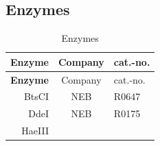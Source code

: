 \documentclass[11pt,singlespacinge,twoside]{reedthesis} %
\theoremstyle{definition}
\theoremstyle{definition}
\theoremstyle{definition}
\theoremstyle{remark}
\begin{document}
\hypertarget{mat-enz}{%
\subsection{Enzymes}\label{mat-enz}}
\begin{longtable}[]{@{}rcl@{}}
\caption{\label{tab:mat-enz} Enzymes}\tabularnewline
\toprule
\begin{minipage}[b]{0.29\columnwidth}\raggedleft
\textbf{Enzyme}\strut
\end{minipage} & \begin{minipage}[b]{0.33\columnwidth}\centering
Company\strut
\end{minipage} & \begin{minipage}[b]{0.29\columnwidth}\raggedright
cat.-no.\strut
\end{minipage}\tabularnewline
\midrule
\endfirsthead
\toprule
\begin{minipage}[b]{0.29\columnwidth}\raggedleft
\textbf{Enzyme}\strut
\end{minipage} & \begin{minipage}[b]{0.33\columnwidth}\centering
Company\strut
\end{minipage} & \begin{minipage}[b]{0.29\columnwidth}\raggedright
cat.-no.\strut
\end{minipage}\tabularnewline
\midrule
\endhead
\begin{minipage}[t]{0.29\columnwidth}\raggedleft
BtsCI\strut
\end{minipage} & \begin{minipage}[t]{0.33\columnwidth}\centering
NEB\strut
\end{minipage} & \begin{minipage}[t]{0.29\columnwidth}\raggedright
R0647\strut
\end{minipage}\tabularnewline
\begin{minipage}[t]{0.29\columnwidth}\raggedleft
DdeI\strut
\end{minipage} & \begin{minipage}[t]{0.33\columnwidth}\centering
NEB\strut
\end{minipage} & \begin{minipage}[t]{0.29\columnwidth}\raggedright
R0175\strut
\end{minipage}\tabularnewline
\begin{minipage}[t]{0.29\columnwidth}\raggedleft
HaeIII\strut
\end{minipage} & \begin{minipage}[t]{0.33\columnwidth}\centering

\end{minipage}
\end{longtable}
\end{document}
